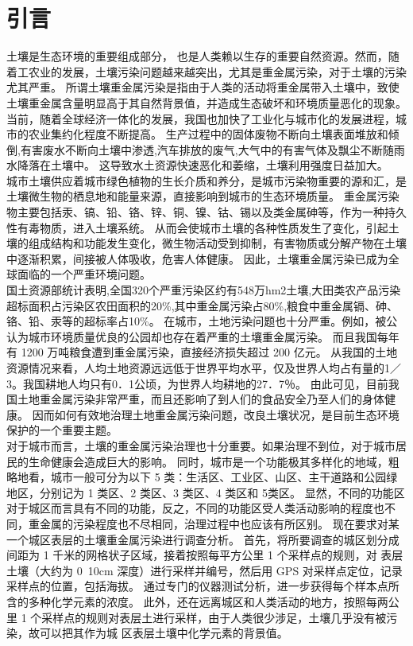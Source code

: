 \documentclass[a4paper]{article}
\begin{document}
\part{引言}
土壤是生态环境的重要组成部分， 也是人类赖以生存的重要自然资源。然而，随着工农业的发展，土壤污染问题越来越突出，尤其是重金属污染，对于土壤的污染尤其严重。
所谓土壤重金属污染是指由于人类的活动将重金属带入土壤中，致使土壤重金属含量明显高于其自然背景值，并造成生态破坏和环境质量恶化的现象。
当前，随着全球经济一体化的发展，我国也加快了工业化与城市化的发展进程，城市的农业集约化程度不断提高。
生产过程中的固体废物不断向土壤表面堆放和倾倒,有害废水不断向土壤中渗透,汽车排放的废气,大气中的有害气体及飘尘不断随雨水降落在土壤中。
这导致水土资源快速恶化和萎缩，土壤利用强度日益加大。   \\
\indent 城市土壤供应着城市绿色植物的生长介质和养分，是城市污染物重要的源和汇，是土壤微生物的栖息地和能量来源，直接影响到城市的生态环境质量。
重金属污染物主要包括汞、镐、铅、铬、锌、铜、镍、钴、锡以及类金属砷等，作为一种持久性有毒物质，进入土壤系统。
从而会使城市土壤的各种性质发生了变化，引起土壤的组成结构和功能发生变化，微生物活动受到抑制，有害物质或分解产物在土壤中逐渐积累，间接被人体吸收，危害人体健康。
因此，土壤重金属污染已成为全球面临的一个严重环境问题。   \\
\indent 国土资源部统计表明,全国320个严重污染区约有548万hm2土壤,大田类农产品污染超标面积占污染区农田面积的20\%,其中重金属污染占80\%,粮食中重金属镉、砷、铬、铅、汞等的超标率占10\%。
在城市，土地污染问题也十分严重。例如，被公认为城市环境质量优良的公园却也存在着严重的土壤重金属污染。
而且我国每年有 1200 万吨粮食遭到重金属污染，直接经济损失超过 200 亿元。
从我国的土地资源情况来看，人均土地资源远远低于世界平均水平，仅及世界人均占有量的1／3。我国耕地人均只有0．1公顷，为世界人均耕地的27．7％。
由此可见，目前我国土地重金属污染非常严重，而且还影响了到人们的食品安全乃至人们的身体健康。
因而如何有效地治理土地重金属污染问题，改良土壤状况，是目前生态环境保护的一个重要主题。    \\
\indent 对于城市而言，土壤的重金属污染治理也十分重要。如果治理不到位，对于城市居民的生命健康会造成巨大的影响。
同时，城市是一个功能极其多样化的地域，粗略地看，城市一般可分为以下 5 类：生活区、工业区、山区、主干道路和公园绿地区，分别记为 1 类区、2 类区、3 类区、4 类区和 5类区。
显然，不同的功能区对于城区而言具有不同的功能，反之，不同的功能区受人类活动影响的程度也不同，重金属的污染程度也不尽相同，治理过程中也应该有所区别。
\indent 现在要求对某一个城区表层的土壤重金属污染进行调查分析。
首先，将所要调查的城区划分成间距为 1 千米的网格状子区域，接着按照每平方公里 1 个采样点的规则，对
表层土壤（大约为 0~10cm 深度）进行采样并编号，然后用 GPS 对采样点定位，记录采样点的位置，包括海拔。
通过专门的仪器测试分析，进一步获得每个样本点所含的多种化学元素的浓度。
此外，还在远离城区和人类活动的地方，按照每两公里 1 个采样点的规则对表层土进行采样，由于人类很少涉足，土壤几乎没有被污染，故可以把其作为城
区表层土壤中化学元素的背景值。\\
\end{document}
